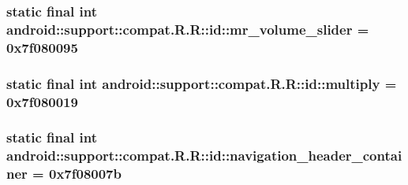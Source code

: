 \hypertarget{classandroid_1_1support_1_1compat_1_1_r_1_1id_8f206d480fdb7223ef342772d096c368}{
\subsubsection[{mr\_\-volume\_\-slider}]{\setlength{\rightskip}{0pt plus 5cm}static final int android::support::compat.R.R::id::mr\_\-volume\_\-slider = 0x7f080095}}
\label{classandroid_1_1support_1_1compat_1_1_r_1_1id_8f206d480fdb7223ef342772d096c368}


\hypertarget{classandroid_1_1support_1_1compat_1_1_r_1_1id_b23ea1966152ef5248631081b4b2d179}{
\subsubsection[{multiply}]{\setlength{\rightskip}{0pt plus 5cm}static final int android::support::compat.R.R::id::multiply = 0x7f080019}}
\label{classandroid_1_1support_1_1compat_1_1_r_1_1id_b23ea1966152ef5248631081b4b2d179}


\hypertarget{classandroid_1_1support_1_1compat_1_1_r_1_1id_d2556be6601236df3925beb8d4d1b247}{
\subsubsection[{navigation\_\-header\_\-container}]{\setlength{\rightskip}{0pt plus 5cm}static final int android::support::compat.R.R::id::navigation\_\-header\_\-container = 0x7f08007b}}
\label{classandroid_1_1support_1_1compat_1_1_r_1_1id_d2556be6601236df3925beb8d4d1b247}



